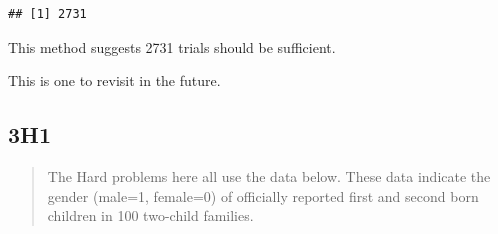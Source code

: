 \documentclass[
]{book}
\begin{document}
\begin{verbatim}
## [1] 2731
\end{verbatim}

This method suggests 2731 trials should be sufficient.

This is one to revisit in the future.

\hypertarget{h1-1}{%
\subsection*{3H1}\label{h1-1}}

\begin{quote}
The Hard problems here all use the data below. These data indicate the gender (male=1, female=0) of officially reported first and second born children in 100 two-child families.
\end{quote}
\end{document}
